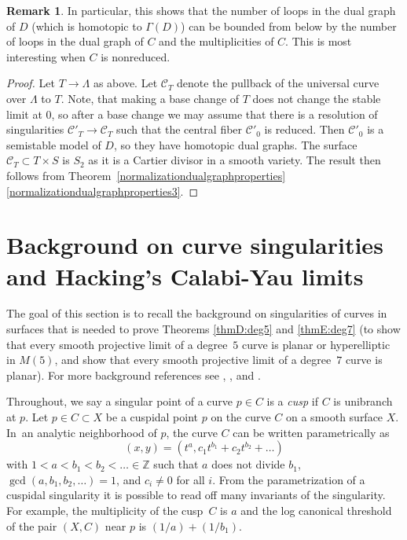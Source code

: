 \documentclass[JEP,XML,SOM,Unicode,NoFloatCountersInSection,published]{cedram}
\theoremstyle{plain}
\theoremstyle{definition}
\newtheorem{remark}[theorem]{Remark}
\newcommand\ZZ{{\mathbb Z}}
\newcommand\Cc{{\mathcal C}}
\begin{document}
\begin{remark}
In particular, this shows that the number of loops in the dual graph of $D$ (which is homotopic to $\Gamma(D)$) can be bounded from below by the number of loops in the dual graph of $C$ and the multiplicities of $C$. This is most interesting when $C$ is nonreduced.
\end{remark}

\begin{proof}
Let $T\to \Lambda$ as above. Let $\Cc_T$ denote the pullback of the universal curve over $\Lambda$ to $T$. Note, that making a base change of $T$ does not change the stable limit at $0$, so after a base change we may assume that there is a resolution of singularities $\Cc'_T\to\Cc_T$ such that the central fiber $\Cc'_0$ is reduced. Then $\Cc'_0$ is a semistable model of $D$, so they have homotopic dual graphs. The surface $\Cc_T\subset T\times S$ is $S_2$ as it is a Cartier divisor in a smooth variety. The result then follows from Theorem~\ref{normalizationdualgraphproperties}\eqref{normalizationdualgraphproperties3}.
\end{proof}

\section{Background on curve singularities and Hacking's Calabi-Yau limits}\label{sec:curvebackground}

The goal of this section is to recall the background on singularities of curves in surfaces that is needed to prove Theorems \ref{thmD:deg5} and \ref{thmE:deg7} (\ie to show that every smooth projective limit of a degree~$5$ curve is planar or hyperelliptic in $M(5)$, and show that every smooth projective limit of a degree~$7$ curve is planar). For more background references see \cite[Ch.\,8]{PlaneAlgCurves}, \cite[Ch.\,2]{TKThesis}, and \cite[Ch.\,2]{MoeThesis}.

Throughout, we say a singular point of a curve $p\in C$ is a \textit{cusp} if $C$ is unibranch at $p$. Let $p \in C \subset X$ be a cuspidal point $p$ on the curve $C$ on a smooth surface $X$. In~an analytic neighborhood of $p$, the curve $C$ can be written parametrically as
\[
(x,y) = (t^a, c_1t^{b_1} + c_2t^{b_2} + \dots)
\]
with $1 < a < b_1 < b_2 < \dots\in \ZZ$ such that $a$ does not divide $b_1$, $\gcd(a, b_1, b_2, \dots) = 1$, and $c_i \ne 0$ for all $i$. From the parametrization of a cuspidal singularity it is possible to read off many invariants of the singularity. For example, the multiplicity of the cusp~$C$ is $a$ and the log canonical threshold of the pair $(X,C)$ near $p$ is $(1/a) + (1/b_1)$.
\end{document}
